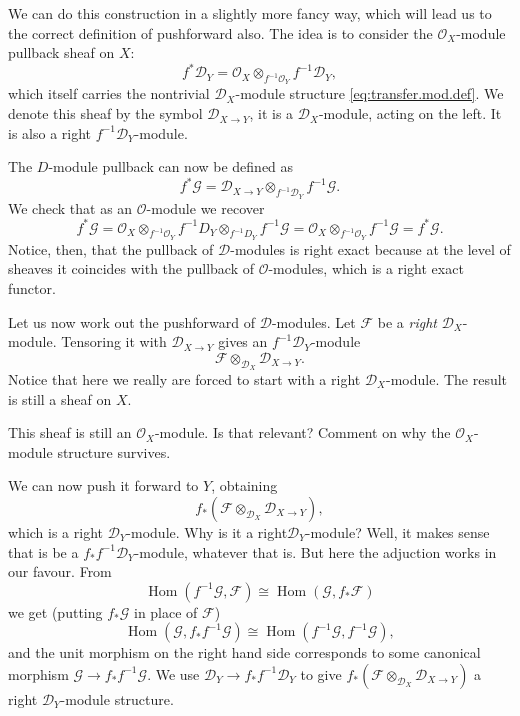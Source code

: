 \documentclass[12pt]{article}
\theoremstyle{plain}
\theoremstyle{definition}
\numberwithin{equation}{section}
\DeclareMathOperator{\Tor}{Tor}
\DeclareMathOperator{\Hom}{Hom}
\newcommand{\CD}{\mathcal{D}}
\newcommand{\CF}{\mathcal{F}}
\newcommand{\CG}{\mathcal{G}}
\newcommand{\OO}{\mathcal{O}}
\begin{document}
We can do this construction in a slightly more fancy way, which will lead us to the correct definition of pushforward also. The idea is to consider the $\OO_X$-module pullback sheaf on $X$:
\[
f^*\CD_Y = \OO_X \otimes_{f^{-1} \OO_Y} f^{-1} \CD_Y,
\]
which itself carries the nontrivial $\CD_X$-module structure \eqref{eq:transfer.mod.def}. We denote this sheaf by the symbol $\CD_{X\rightarrow Y}$, it is a $\CD_X$-module, acting on the left. It is also a right $f^{-1}\CD_Y$-module.


The $D$-module pullback can now be defined as
\[
f^*\CG = \CD_{X\rightarrow Y} \otimes_{f^{-1} \CD_Y} f^{-1} \CG.
\]
We check that as an $\OO$-module we recover
\[
f^*\CG = \OO_X \otimes_{f^{-1} \OO_Y} f^{-1} D_Y \otimes_{f^{-1} D_Y} f^{-1} \CG = \OO_X \otimes_{f^{-1} \OO_Y} f^{-1} \CG = f^*\CG.
\]
Notice, then, that the pullback of $\CD$-modules is right exact because at the level of sheaves it coincides with the pullback of $\OO$-modules, which is a right exact functor.






Let us now work out the pushforward of $\CD$-modules.
Let $\CF$ be a \emph{right} $\CD_X$-module. Tensoring it with $\CD_{X \rightarrow Y}$ gives an $f^{-1} \CD_Y$-module
\[
\CF \otimes_{\CD_X} \CD_{X \rightarrow Y}.
\]
Notice that here we really are forced to start with a right $\CD_X$-module. The result is still a sheaf on $X$.

{\color{red}This sheaf is still an $\OO_X$-module. Is that relevant? Comment on why the $\OO_X$-module structure survives.}


We can now push it forward to $Y$, obtaining
\[
f_*(\CF \otimes_{\CD_X} \CD_{X \rightarrow Y}),
\]
which is a right $\CD_Y$-module. Why is it a right$\CD_Y$-module? Well, it makes sense that is be a $f_*f^{-1}\CD_Y$-module, whatever that is. But here the adjuction works in our favour. From
\[
\Hom(f^{-1}\CG, \CF) \cong \Hom(\CG, f_*\CF)
\]
we get (putting $f_*\CG$ in place of $\CF$)
\[
\Hom(\CG, f_*f^{-1}\CG) \cong \Hom(f^{-1}\CG, f^{-1}\CG),
\]
and the unit morphism on the right hand side corresponds to some canonical morphism $\CG \rightarrow f_*f^{-1}\CG$. We use $\CD_Y \rightarrow f_*f^{-1}\CD_Y$ to give $f_*(\CF \otimes_{\CD_X} \CD_{X \rightarrow Y})$ a right $\CD_Y$-module structure.
\end{document}
